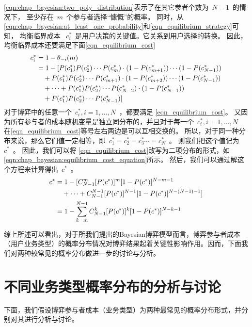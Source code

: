 \eqref{eqn:chap_bayesian:two_poly_distribution}表示了在其它参者个数为~$N-1$~的情况下，
至少存在~$m$~个参与者选择“慷慨”的概率。
同时，从\eqref{eqn:chap_bayesian:at_least_one_probability}和\eqref{eqn_equilibrium_strategy}可知，
均衡临界成本 ~$c_i^*$~是用户决策的关键值。它关系到用户选择的转换。
因此，均衡临界成本还要满足下面\eqref{eqn_equilibrium_cost}
\begin{align}
    c_i^* &= 1 - \theta_{-i} (m) \notag \\
     & =1 - [P(c_1^*)P(c_2^*)\cdots P(c_{m}^*) \cdot (1-P(c_{m+1}^*)) \cdots(1-P(c_{N-1}^*)) \notag \\ 
    & \quad +  P(c_1^*)P(c_2^*)\cdots P(c_{m+1}^*) \cdot (1-P(c_{m+2}^*)) \cdots(1-P(c_{N-1}^*)) \notag \\ 
    & \quad + \cdots  + P(c_1^*)P(c_2^*)\cdots P(c_{N-2}^*) \cdot (1-P(c_{N-1}^*)) \notag \\
    & \quad +  P(c_1^*)P(c_2^*)\cdots P(c_{N-1}^*) ]
    \label{eqn_equilibrium_cost} 
\end{align}
对于博弈中的任意一个~$c_i^*, i=1,\ldots, N$~，都要满足
\eqref{eqn_equilibrium_cost}。
又因为所有参与者的成本随机变量是独立同分布的，并且对于每一个~$c_i^*, i=1,\ldots, N$~
在\eqref{eqn_equilibrium_cost}等号左右两边是可以互相交换的。
所以，对于同一种分布来说，那么它们值一定相等，即~$c_1^* = c_2^* = c_3^* \cdots = c_N^*$~。
则我们把这个值记为~$c^*$~。
因此，我们可以将 \eqref{eqn_equilibrium_cost}改写为二项分布的形式，如
\eqref{eqn:chap_bayesian:equilibrium_cost_equation}所示。
然后，我们可以通过解这个方程来计算得出~$c^*$~。
\begin{align}  
    c^* & =  1 - [ C_{N-1}^m [P(c^*)]^m [1-P(c^*)]^{N-m-1} \notag \\
   & \quad + \cdots + C_{N-1}^{N-1} [P(c^*)]^{N-1} [1-P(c^*)]^{N-(N-1)-1} ]\notag \\
   &= 1- \sum_{k=m}^{N-1}C_{N-1}^k [P(c^*)]^k [1-P(c^*)]^{N-k-1}
\label{eqn:chap_bayesian:equilibrium_cost_equation}
\end{align}

综上所述可以看出，对于所我们提出的Bayesian博弈模型而言，博弈参与者成本（用户业务类型）的概率分布情况对博弈结果起着关键性影响作用。因而，下面我们对两种较常见的概率分布做进一步的讨论与分析。

\section{不同业务类型概率分布的分析与讨论}
下面，我们假设博弈参与者成本（业务类型）为两种最常见的概率分布形式，并分别对其进行分析与讨论。
